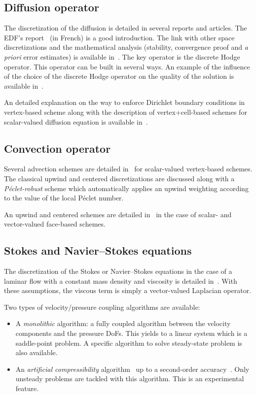 \subsection{Diffusion operator}

The discretization of the diffusion is detailed in several reports and
articles. The EDF's report~\cite{Bonel12} (in French) is a good
introduction. The link with other space discretizations and the mathematical
analysis (stability, convergence proof and \emph{a priori} error estimates) is
available in~\cite{BonEr14}. The key operator is the discrete Hodge
operator. This operator can be built in several ways. An example of the
influence of the choice of the discrete Hodge operator on the quality of the
solution is available in~\cite{BDPE15}.

An detailed explanation on the way to enforce Dirichlet boundary conditions in
vertex-based scheme along with the description of vertex+cell-based schemes for
scalar-valued diffusion equation is available in~\cite{Cant16}.

\subsection{Convection operator}

Several advection schemes are detailed in~\cite{Cant16} for scalar-valued
vertex-based schemes. The classical upwind and centered discretizations are
discussed along with a \emph{P\'eclet-robust} scheme which automatically
applies an upwind weighting according to the value of the local P\'eclet
number.

An upwind and centered schemes are detailed in~\cite{Mila20} in the case of
scalar- and vector-valued face-based schemes.

\subsection{Stokes and Navier--Stokes equations}

The discretization of the Stokes or Navier--Stokes equations in the case of a
laminar flow with a constant mass density and viscosity is detailed
in~\cite{Mila20}. With these assumptions, the viscous term is simply a
vector-valued Laplacian operator.

Two types of velocity/pressure coupling algorithms are available:
\begin{itemize}
\item A \emph{monolithic} algorithm: a fully coupled algorithm between the
  velocity components and the pressure DoFs. This yields to a linear system
  which is a saddle-point problem. A specific algorithm to solve steady-state
  problem is also available.
\item An \emph{artificial compressibility} algorithm~\cite{GuMi15} up to a
  second-order accuracy~\cite{MiBoE22}. Only unsteady problems are tackled with this
  algorithm. This is an experimental feature.
\end{itemize}

